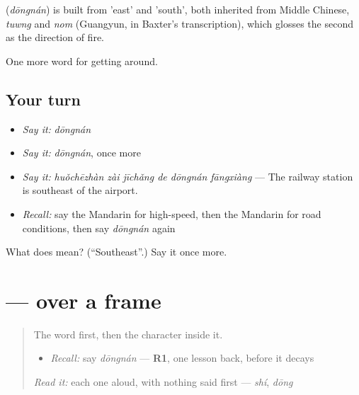 \begin{cousinweb}
\textbf{} (\emph{dōngnán}) is built from  'east' and  'south', both inherited from Middle Chinese, \emph{tuwng} and \emph{nom} (Guangyun, in Baxter's transcription), which glosses the second as the direction of fire.
\end{cousinweb}

\begin{grammarlens}[title={What you've built}]
One more word for getting around.
\end{grammarlens}

\subsection*{Your turn}
\begin{itemize}
\raggedright
  \item \emph{Say it:} \emph{dōngnán}
  \item \emph{Say it:} \emph{dōngnán}, once more
  \item \emph{Say it:} \emph{huǒchēzhàn zài jīchǎng de dōngnán fāngxiàng} — The railway station is southeast of the airport.
  \item \emph{Recall:} say the Mandarin for high-speed, then the Mandarin for road conditions, then say \emph{dōngnán} again
\end{itemize}

\begin{tcolorbox}[breakable,colback=teal!4,colframe=teal!35!black,title={Before you move on}]
What does  mean? (\textquotedblleft{}Southeast\textquotedblright{}.) Say it once more.
\end{tcolorbox}
\section[\texorpdfstring{\zh{南} (nán)}{南 (nán)}]{ —  over a frame}

\label{lesson:ZH-W423-nan-south}



\begin{quote}
The word first, then the character inside it.

\begin{itemize}
\raggedright
  \item \emph{Recall:} say \emph{dōngnán} — \textbf{R1}, one lesson back, before it decays
\end{itemize}

\begin{quote}
 
\end{quote}

\emph{Read it:} each one aloud, with nothing said first — \emph{shí}, \emph{dōng}
\end{quote}

